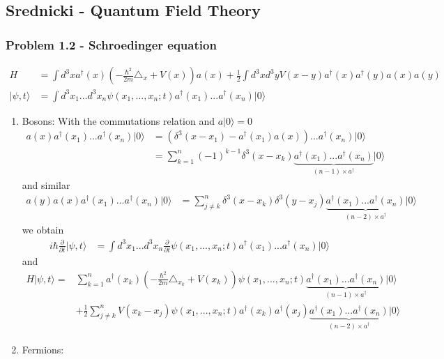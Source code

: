 \documentclass[10pt,a4paper]{article}
\theoremstyle{definition}
\begin{document}
\subsection{{\sc Srednicki} - Quantum Field Theory}
\subsubsection{Problem 1.2 - Schroedinger equation}
\begin{align}
    H&=\int d^3x a^\dagger(x)\left(-\frac{\hbar^2}{2m}\triangle_x+V(x)\right)a(x)+\frac{1}{2}\int d^3xd^3yV(x-y)a^\dagger(x)a^\dagger(y)a(x)a(y)\\
    |\psi,t\rangle&=\int d^3x_1...d^3x_n\psi(x_1,...,x_n;t)a^\dagger(x_1)...a^\dagger(x_n)|0\rangle
\end{align}
\begin{enumerate}
    \item Bosons:
    With the commutations relation and $a|0\rangle=0$
    \begin{align}
        a(x)a^\dagger(x_1)...a^\dagger(x_n)|0\rangle
        &=\left(\delta^3(x-x_1)-a^\dagger(x_1)a(x)\right)...a^\dagger(x_n)|0\rangle\\
        &=\sum_{k=1}^n(-1)^{k-1} \delta^3(x-x_k)\underbrace{a^\dagger(x_1)...a^\dagger(x_n)}_{(n-1) \times a^\dagger}|0\rangle
    \end{align}
    and similar
    \begin{align}
        a(y)a(x)a^\dagger(x_1)...a^\dagger(x_n)|0\rangle
        &=\sum_{j\neq k}^n \delta^3(x-x_k)\delta^3(y-x_j)\underbrace{a^\dagger(x_1)...a^\dagger(x_n)}_{(n-2) \times a^\dagger}|0\rangle
    \end{align}
    we obtain
	\begin{align}
		i\hbar\frac{\partial}{\partial t}|\psi,t\rangle
		&=\int d^3x_1...d^3x_n\frac{\partial}{\partial t}\psi(x_1,...,x_n;t)a^\dagger(x_1)...a^\dagger(x_n)|0\rangle 
	\end{align}
    and
    \begin{align}
        H|\psi,t\rangle=&\sum_{k=1}^na^\dagger(x_k)\left(-\frac{\hbar^2}{2m}\triangle_{x_k}+V(x_k)\right)\psi(x_1,...,x_n;t)\underbrace{a^\dagger(x_1)...a^\dagger(x_n)}_{(n-1) \times a^\dagger}|0\rangle\\
        &+\frac{1}{2}\sum_{j\neq k}^nV(x_k-x_j)\psi(x_1,...,x_n;t)a^\dagger(x_k)a^\dagger(x_j)\underbrace{a^\dagger(x_1)...a^\dagger(x_n)}_{(n-2) \times a^\dagger}|0\rangle
    \end{align}
    \item Fermions:
\end{enumerate}
\end{document}
